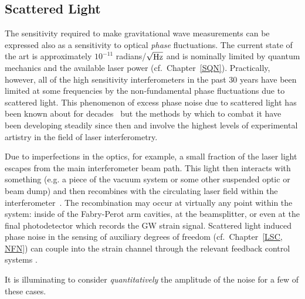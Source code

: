 \subsection{Scattered Light}
\label{s:IDC:scatter}
The sensitivity required to make gravitational wave measurements can
be expressed also as a sensitivity to optical \textit{phase} fluctuations.
The current state of the art is approximately
$10^{-11}$ radians/$\sqrt{\rm Hz}$ and is nominally limited by
quantum mechanics and the available laser power
(cf.~Chapter~\ref{SQN}).
Practically, however, all of the high
sensitivity interferometers in the past 30 years have been limited
at some frequencies by the non-fundamental phase fluctuations due to
scattered light. This phenomenon of excess phase noise due to scattered
light has been known about for decades~\cite{Schilling:1981} but
the methods by which to combat it have been developing steadily since
then and involve the highest levels of experimental artistry in the
field of laser interferometry.

Due to imperfections in the optics, for example, a small fraction of
the laser light escapes from the main interferometer beam path. This
light then interacts with something (e.g. a piece of the vacuum system
or some other suspended optic or beam dump) and then recombines with the
circulating laser field within the
interferometer~\cite{Kip:Scatter95, Kip:scatter1989, Sam:Scatter2012,
Stefano:Scatter, vinet1997scattered, fritschel1998high}.
The recombination may occur at virtually any point within the system:
inside of the Fabry-Perot arm cavities, at the beamsplitter, or even at
the final photodetector which records the GW strain signal. Scattered
light induced phase noise in the sensing of auxiliary degrees of
freedom (cf.~Chapter~\ref{LSC, NFN}) can couple into the strain channel
through the relevant feedback control systems .

It is illuminating to consider \emph{quantitatively} the amplitude of
the noise for a few of these cases.

